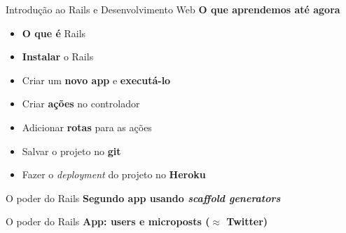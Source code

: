 \documentclass[10pt]{beamer}
\begin{document}
\begin{frame}{Introdução ao Rails e Desenvolvimento Web}
  \huge
  \textbf{O que aprendemos até agora}
  \vfill
  \large
  \begin{itemize}
    \item \textbf{O que é} Rails
    \item \textbf{Instalar} o Rails
    \item Criar um \textbf{novo app} e \textbf{executá-lo}
    \item Criar \textbf{ações} no controlador
    \item Adicionar \textbf{rotas} para as ações
    \item Salvar o projeto no \textbf{git}
    \item Fazer o \textit{deployment} do projeto no \textbf{Heroku}
  \end{itemize}
\end{frame}

\begin{frame}{O poder do Rails}
  \HUGE
  \textbf{Segundo app usando \textit{scaffold generators}}
\end{frame}

\begin{frame}{O poder do Rails}
  \LARGE
  \textbf{App: users e microposts ($\approx$ Twitter)}
\end{frame}
\end{document}
